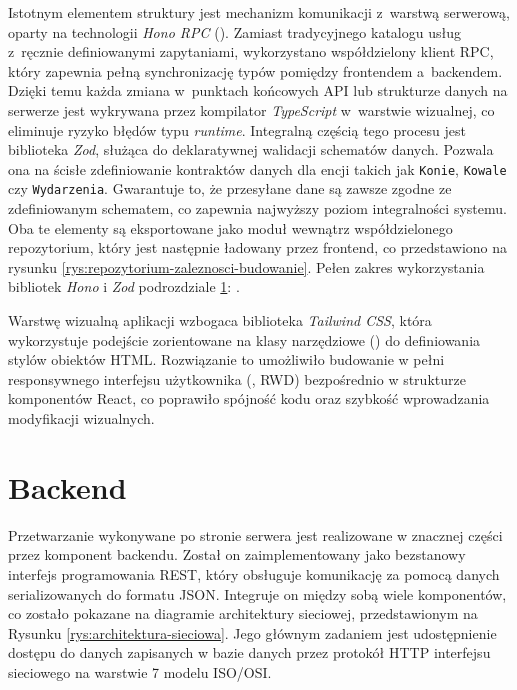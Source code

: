 Istotnym elementem struktury jest mechanizm komunikacji z~warstwą serwerową, oparty na technologii \textit{Hono RPC} (). Zamiast tradycyjnego katalogu usług z~ręcznie definiowanymi zapytaniami, wykorzystano współdzielony klient RPC, który zapewnia pełną synchronizację typów pomiędzy frontendem a~backendem. Dzięki temu każda zmiana w~punktach końcowych API lub strukturze danych na serwerze jest wykrywana przez kompilator \textit{TypeScript} w~warstwie wizualnej, co eliminuje ryzyko błędów typu \textit{runtime}. Integralną częścią tego procesu jest biblioteka \textit{Zod}, służąca do deklaratywnej walidacji schematów danych. Pozwala ona na ścisłe zdefiniowanie kontraktów danych dla encji takich jak \texttt{Konie}, \texttt{Kowale} czy \texttt{Wydarzenia}. Gwarantuje to, że przesyłane dane są zawsze zgodne ze zdefiniowanym schematem, co zapewnia najwyższy poziom integralności systemu. Oba te elementy są eksportowane jako moduł wewnątrz współdzielonego repozytorium, który jest następnie ładowany przez frontend, co przedstawiono na rysunku \ref{rys:repozytorium-zaleznosci-budowanie}. Pełen zakres wykorzystania bibliotek \textit{Hono} i \textit{Zod} podrozdziale \ref{sec:backend}: .

Warstwę wizualną aplikacji wzbogaca biblioteka \textit{Tailwind CSS}, która wykorzystuje podejście zorientowane na klasy narzędziowe () do definiowania stylów obiektów HTML. Rozwiązanie to umożliwiło budowanie w pełni responsywnego interfejsu użytkownika (, RWD) bezpośrednio w strukturze komponentów React, co poprawiło spójność kodu oraz szybkość wprowadzania modyfikacji wizualnych.

\section{Backend} \label{sec:backend}

Przetwarzanie wykonywane po stronie serwera jest realizowane w znacznej części przez komponent backendu. Został on zaimplementowany jako bezstanowy interfejs programowania REST, który obsługuje komunikację za pomocą danych serializowanych do formatu JSON. Integruje on między sobą wiele komponentów, co zostało pokazane na diagramie architektury sieciowej, przedstawionym na Rysunku \ref{rys:architektura-sieciowa}. Jego głównym zadaniem jest udostępnienie dostępu do danych zapisanych w bazie danych przez protokół HTTP interfejsu sieciowego na warstwie 7 modelu ISO/OSI.


